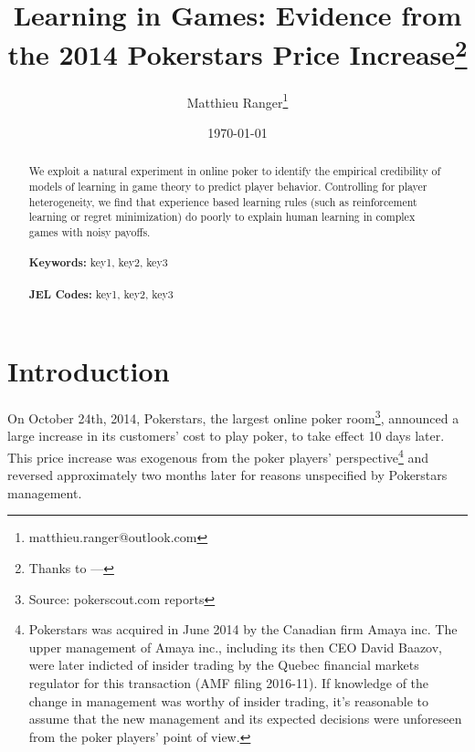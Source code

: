 \documentclass[12pt]{article}
\begin{document}
\begin{titlepage}
\title{Learning in Games: Evidence from the 2014 Pokerstars Price Increase\thanks{Thanks to ---}}
\author{Matthieu Ranger\thanks{matthieu.ranger@outlook.com}}
\date{\today}
\maketitle


\begin{abstract}
\noindent We exploit a natural experiment in online poker to identify the empirical credibility of models of learning in game theory to predict player behavior. Controlling for player heterogeneity, we find that experience based learning rules (such as reinforcement learning or regret minimization) do poorly to explain human learning in complex games with noisy payoffs.\\
\vspace{0in}\\
\noindent\textbf{Keywords:} key1, key2, key3\\
\vspace{0in}\\
\noindent\textbf{JEL Codes:} key1, key2, key3\\


\bigskip
\end{abstract}
\setcounter{page}{0}
\thispagestyle{empty}
\end{titlepage}
\pagebreak \newpage




\doublespacing


\section{Introduction} \label{sec:introduction}

On October 24th, 2014, Pokerstars, the largest online poker room\footnote{Source: pokerscout.com reports}, announced a large increase in its customers’ cost to play poker, to take effect 10 days later. This price increase was exogenous from the poker players’ perspective\footnote{Pokerstars was acquired in June 2014 by the Canadian firm Amaya inc. The upper management of Amaya inc., including its then CEO David Baazov, were later indicted of insider trading by the Quebec financial markets regulator for this transaction (AMF filing 2016-11). If knowledge of the change in management was worthy of insider trading, it's reasonable to assume that the new management and its expected decisions were unforeseen from the poker players’ point of view.} and reversed approximately two months later for reasons unspecified by Pokerstars management.
\end{document}
